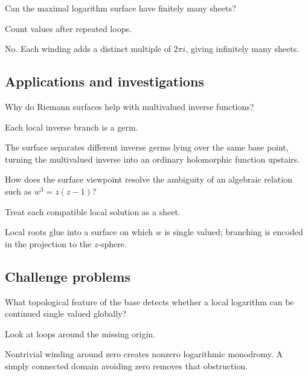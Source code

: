 \begin{exercise}\label{exr:iv22-expand-12}
Can the maximal logarithm surface have finitely many sheets?
\end{exercise}
\begin{hint}
Count values after repeated loops.
\end{hint}
\begin{solution}
No. Each winding adds a distinct multiple of \(2\pi i\), giving infinitely many sheets.
\end{solution}

\subsection*{Applications and investigations}

\begin{exercise}\label{exr:iv22-expand-13}
Why do Riemann surfaces help with multivalued inverse functions?
\end{exercise}
\begin{hint}
Each local inverse branch is a germ.
\end{hint}
\begin{solution}
The surface separates different inverse germs lying over the same base point, turning the multivalued inverse into an ordinary holomorphic function upstairs.
\end{solution}

\begin{exercise}\label{exr:iv22-expand-14}
How does the surface viewpoint resolve the ambiguity of an algebraic relation such as \(w^3=z(z-1)\)?
\end{exercise}
\begin{hint}
Treat each compatible local solution as a sheet.
\end{hint}
\begin{solution}
Local roots glue into a surface on which \(w\) is single valued; branching is encoded in the projection to the \(z\)-sphere.
\end{solution}

\subsection*{Challenge problems}

\begin{exercise}\label{exr:iv22-expand-15}
What topological feature of the base detects whether a local logarithm can be continued single valued globally?
\end{exercise}
\begin{hint}
Look at loops around the missing origin.
\end{hint}
\begin{solution}
Nontrivial winding around zero creates nonzero logarithmic monodromy. A simply connected domain avoiding zero removes that obstruction.
\end{solution}

